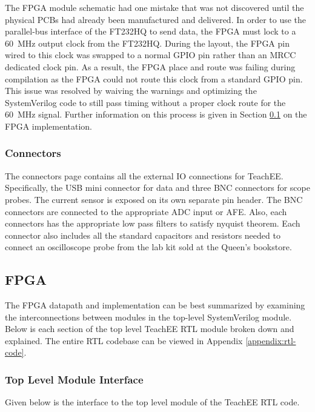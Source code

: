 \documentclass[letterpaper,11pt]{article}
\begin{document}
The FPGA module schematic had one mistake that was not discovered until the
physical PCBs had already been manufactured and delivered. In order to use the
parallel-bus interface of the FT232HQ to send data, the FPGA must lock to a
\SI{60}{\mega\hertz} output clock from the FT232HQ. During the layout, the FPGA
pin wired to this clock was swapped to a normal GPIO pin rather than an MRCC
dedicated clock pin. As a result, the FPGA place and route was failing during
compilation as the FPGA could not route this clock from a standard GPIO pin.
This issue was resolved by waiving the warnings and optimizing the SystemVerilog
code to still pass timing without a proper clock route for the
\SI{60}{\mega\hertz} signal. Further information on this process is given in
Section \ref{sec:fpga-impl} on the FPGA implementation.

\subsubsection{Connectors}
The connectors page contains all the external IO connections for TeachEE.
Specifically, the USB mini connector for data and three BNC connectors for scope
probes. The current sensor is exposed on its own separate pin header. The BNC
connectors are connected to the appropriate ADC input or AFE. Also, each
connectors has the appropriate low pass filters to satisfy nyquist theorem. Each
connector also includes all the standard capacitors and resistors needed to
connect an oscilloscope probe from the lab kit sold at the Queen's bookstore.
\subsection{FPGA} \label{sec:fpga-impl} %

The FPGA datapath and implementation can be best summarized by examining the
interconnections between modules in the top-level SystemVerilog module. Below is
each section of the top level TeachEE RTL module broken down and explained. The
entire RTL codebase can be viewed in Appendix \ref{appendix:rtl-code}.

\subsubsection{Top Level Module Interface}
Given below is the interface to the top level module of the TeachEE RTL code.
\end{document}
